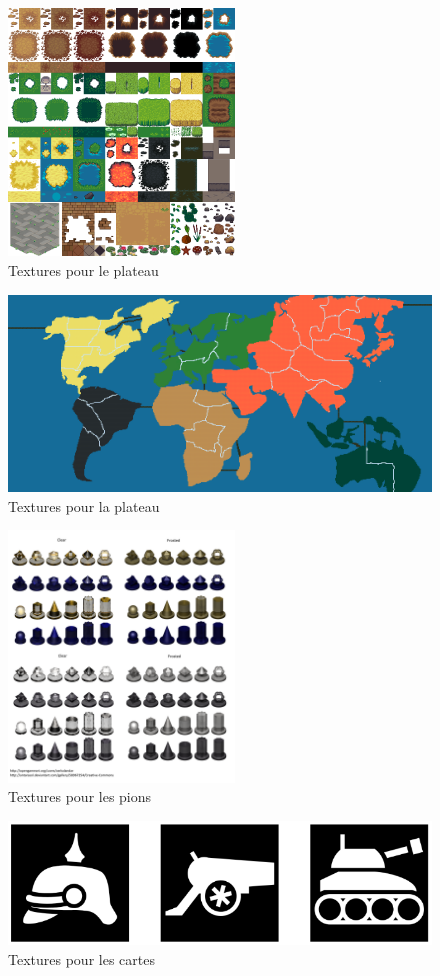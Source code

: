     \begin{figure}[!htbp]
        \centering
        \includegraphics[width=6cm]{Images/terrain.png}
        \caption{Textures pour le plateau}
        \label{fig:textures_plateau}
    \end{figure}

    
    \begin{figure}[!htbp]
        \centering
        \includegraphics[width=13cm]{Images/map_jeu.png}
        \caption{Textures pour la plateau}
        \label{fig:textures_plateau2}
    \end{figure}
    
    \begin{figure}[!htbp]
        \centering
        \includegraphics[width=6cm]{Images/pions.png}
        \caption{Textures pour les pions}
        \label{fig:textures_pions}
    \end{figure}
    
    \begin{figure}[!htbp]
        \centering
        \includegraphics[width=14cm]{Images/cartes.png}
        \caption{Textures pour les cartes}
        \label{fig:textures_cartes}
    \end{figure}
